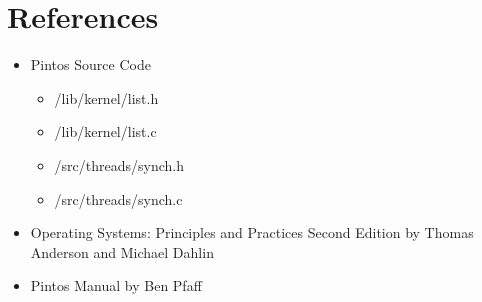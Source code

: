 \documentclass[11pt, letterpaper]{article}
\begin{document}
\pagebreak

\section*{References}

\begin{itemize}
\item Pintos Source Code
	\begin{itemize}
	\item /lib/kernel/list.h
	\item /lib/kernel/list.c
	\item /src/threads/synch.h
	\item /src/threads/synch.c
	\end{itemize}
\item Operating Systems: Principles and Practices Second Edition by Thomas Anderson and Michael Dahlin
\item Pintos Manual by Ben Pfaff
\end{itemize}
	
\end{document}

